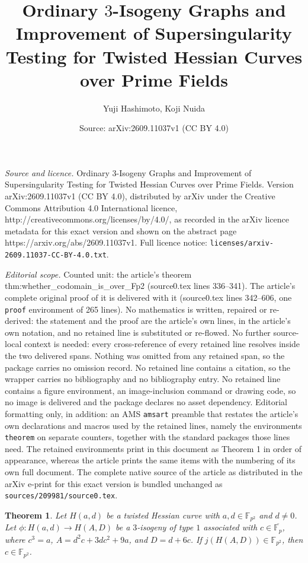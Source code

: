 \documentclass[10pt,a4paper]{amsart}
\title{Ordinary $3$-Isogeny Graphs and Improvement of Supersingularity Testing for Twisted Hessian Curves over Prime Fields}
\author{Yuji Hashimoto, Koji Nuida}
\date{Source: arXiv:2609.11037v1 (CC BY 4.0)}
\newtheorem{theorem}{Theorem}
\newcommand{\FF}{\mathbb{F}}
\begin{document}
\maketitle

\noindent\emph{Source and licence.} Ordinary $3$-Isogeny Graphs and Improvement of Supersingularity Testing for Twisted Hessian Curves over Prime Fields. Version arXiv:2609.11037v1 (CC BY 4.0), distributed by arXiv under the Creative Commons Attribution 4.0 International licence, http://creativecommons.org/licenses/by/4.0/, as recorded in the arXiv licence metadata for this exact version and shown on the abstract page https://arxiv.org/abs/2609.11037v1. Full licence notice: \texttt{licenses/arxiv-2609.11037-CC-BY-4.0.txt}.\par\smallskip

\noindent\textit{Editorial scope.} Counted unit: the article's theorem thm:whether\_codomain\_is\_over\_Fp2 (source0.tex lines 336--341). The article's complete original proof of it is delivered with it (source0.tex lines 342--606, one \texttt{proof} environment of 265 lines). No mathematics is written, repaired or re-derived: the statement and the proof are the article's own lines, in the article's own notation, and no retained line is substituted or re-flowed.  No further source-local context is needed: every cross-reference of every retained line resolves inside the two delivered spans.  Nothing was omitted from any retained span, so the package carries no omission record.  No retained line contains a citation, so the wrapper carries no bibliography and no bibliography entry.  No retained line contains a figure environment, an image-inclusion command or drawing code, so no image is delivered and the package declares no asset dependency.  Editorial formatting only, in addition: an AMS \texttt{amsart} preamble that restates the article's own declarations and macros used by the retained lines, namely the environments \texttt{theorem} on separate counters, together with the standard packages those lines need.  The retained environments print in this document as Theorem 1 in order of appearance, whereas the article prints the same items with the numbering of its own full document.  The complete native source of the article as distributed in the arXiv e-print for this exact version is bundled unchanged as \texttt{sources/209981/source0.tex}.
\begin{theorem}
\label{thm:whether_codomain_is_over_Fp2}
Let $H(a,d)$ be a twisted Hessian curve with $a,d \in \FF_{p^2}$ and $d \neq 0$.
Let $\phi \colon H(a,d) \to H(A,D)$ be a $3$-isogeny of type $1$ associated with $c \in \overline{\FF_p}$, where $c^3 = a$, $A = d^2 c + 3 d c^2 + 9a$, and $D = d + 6c$.
If $j(H(A,D)) \in \FF_{p^2}$, then $c \in \FF_{p^2}$.
\end{theorem}
\end{document}
